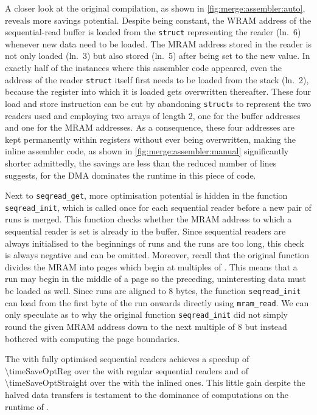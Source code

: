 A closer look at the original compilation, as shown in \cref{fig:merge:assembler:auto}, reveals more savings potential.
Despite being constant, the \ac{WRAM} address of the sequential-read buffer is loaded from the \lstinline[keywords={}]|struct| representing the reader (ln.~6) whenever new data need to be loaded.
The \ac{MRAM} address stored in the reader is not only loaded (ln.~3) but also stored (ln.~5) after being set to the new value.
In exactly half of the instances where this assembler code appeared, even the address of the reader \lstinline[keywords={}]|struct| itself first needs to be loaded from the stack (ln.~2), because the register into which it is loaded gets overwritten thereafter.
These four load and store instruction can be cut by abandoning \lstinline[keywords={}]|struct|s to represent the two readers used and employing two arrays of length 2, one for the buffer addresses and one for the \ac{MRAM} addresses.
As a consequence, these four addresses are kept permanently within registers without ever being overwritten, making the inline assembler code, as shown in \cref{fig:merge:assembler:manual} significantly shorter \Dash admittedly, the savings are less than the reduced number of lines suggests, for the \ac{DMA} dominates the runtime in this piece of code.

Next to \lstinline|seqread_get|, more optimisation potential is hidden in the function \lstinline|seqread_init|, which is called once for each sequential reader before a new pair of runs is merged.
This function checks whether the \ac{MRAM} address to which a sequential reader is set is already in the buffer.
Since sequential readers are always initialised to the beginnings of runs and the runs are too long, this check is always negative and can be omitted.
Moreover, recall that the original function divides the \ac{MRAM} into pages which begin at multiples of \seqreadcachesize{}.
This means that a run may begin in the middle of a page so the preceding, uninteresting data must be loaded as well.
Since runs are aligned to 8 bytes, the function \lstinline|seqread_init| can load from the first byte of the run onwards directly using \lstinline|mram_read|.
We can only speculate as to why the original function \lstinline|seqread_init| did not simply round the given \ac{MRAM} address down to the next multiple of 8 but instead bothered with computing the page boundaries.

The \MS{} with fully optimised sequential readers achieves a speedup of \num[round-mode=places, round-precision=2]{\timeSaveOptReg} over the \MS{} with regular sequential readers and of \num[round-mode=places, round-precision=2]{\timeSaveOptStraight} over the \MS{} with the inlined ones.
This little gain despite the halved data transfers is testament to the dominance of computations on the runtime of \MS{}.

